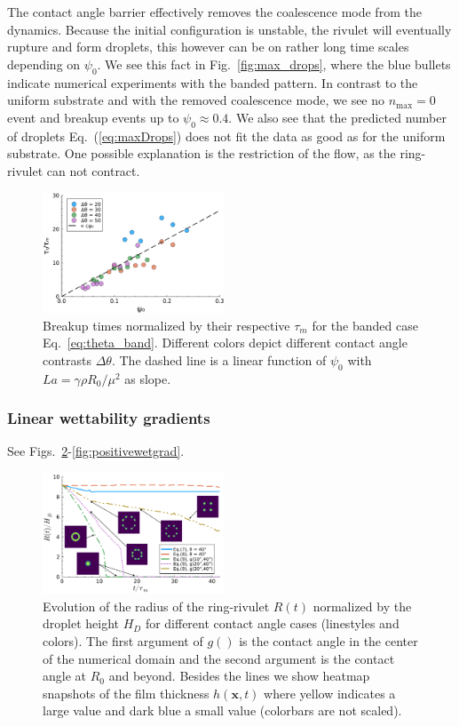 \documentclass[twoside,twocolumn,9pt]{article}
\begin{document}
The contact angle barrier effectively removes the coalescence mode from the dynamics.
Because the initial configuration is unstable, the rivulet will eventually rupture and form droplets, this however can be on rather long time scales depending on $\psi_0$.
We see this fact in Fig.~\ref{fig:max_drops}, where the blue bullets indicate numerical experiments with the banded pattern.
In contrast to the uniform substrate and with the removed coalescence mode, we see no $n_{\max} = 0$ event and breakup events up to $\psi_0 \approx 0.4$.
We also see that the predicted number of droplets Eq.~(\ref{eq:maxDrops}) does not fit the data as good as for the uniform substrate.
One possible explanation is the restriction of the flow, as the ring-rivulet can not contract. 

\begin{figure}
    \centering
    \includegraphics[width=0.48\textwidth]{assets/bandBreakup_timescales.pdf}
    \caption{Breakup times normalized by their respective $\tau_m$ for the banded case Eq.~\ref{eq:theta_band}.
    Different colors depict different contact angle contrasts $\Delta\theta$.
    The dashed line is a linear function of $\psi_0$ with $La = \gamma\rho R_0/\mu^2$ as slope.}
    \label{fig:bandBreakupT}
\end{figure}


\subsubsection{Linear wettability gradients}\label{subsubsec:linwettgrad}
See Figs.~\ref{fig:negativewetgrad}-\ref{fig:positivewetgrad}.
\begin{figure}
    \centering
    \includegraphics[width=0.48\textwidth]{assets/grad_heatmap.pdf}
    \caption{Evolution of the radius of the ring-rivulet $R(t)$ normalized by the droplet height $H_D$ for different contact angle cases (linestyles and colors).
    The first argument of $g()$ is the contact angle in the center of the numerical domain and the second argument is the contact angle at $R_0$ and beyond. 
    Besides the lines we show heatmap snapshots of the film thickness $h(\mathbf{x},t)$ where yellow indicates a large value and dark blue a small value (colorbars are not scaled).}
    \label{fig:negativewetgrad}
\end{figure}
\end{document}
